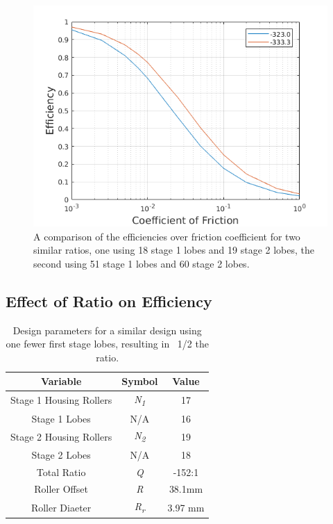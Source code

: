 \begin{figure}[t]
	\centering
	\includegraphics[width=0.75\linewidth]{fig/two_stage_more_pins}
   \caption{A comparison of the efficiencies over friction coefficient for two similar ratios, one using 18 stage 1 lobes and 19 stage 2 lobes, the second using 51 stage 1 lobes and 60 stage 2 lobes.}
   \label{fig:two_stage_more_pins}
\end{figure}

\subsection{Effect of Ratio on Efficiency} \label{ch:dual:discussion:ratio}

\begin{table}[h]
  \vskip0.2cm
  \caption{Design parameters for a similar design using one fewer first stage lobes, resulting in ~1/2 the ratio.}
  \label{table:two_stage_lower_ratio}
  \begin{center}
    \vskip-0.2cm
	\begin{tabular}{|c|c|c|}
		\hline
		Variable & Symbol & Value\\
		\hline
		Stage 1 Housing Rollers & \textit{N\textsubscript{1}} & 17\\
		\hline
		Stage 1 Lobes & N/A & 16\\
		\hline
		Stage 2 Housing Rollers & \textit{N\textsubscript{2}} & 19\\
		\hline
		Stage 2 Lobes & N/A & 18\\
		\hline
		Total Ratio & \textit{Q} & -152:1 \\
		\hline
		Roller Offset & \textit{R} & 38.1mm \\
		\hline
		Roller Diaeter & \textit{R\textsubscript{r}} & 3.97 mm\\
		\hline
	\end{tabular}
  \end{center}
\end{table}

